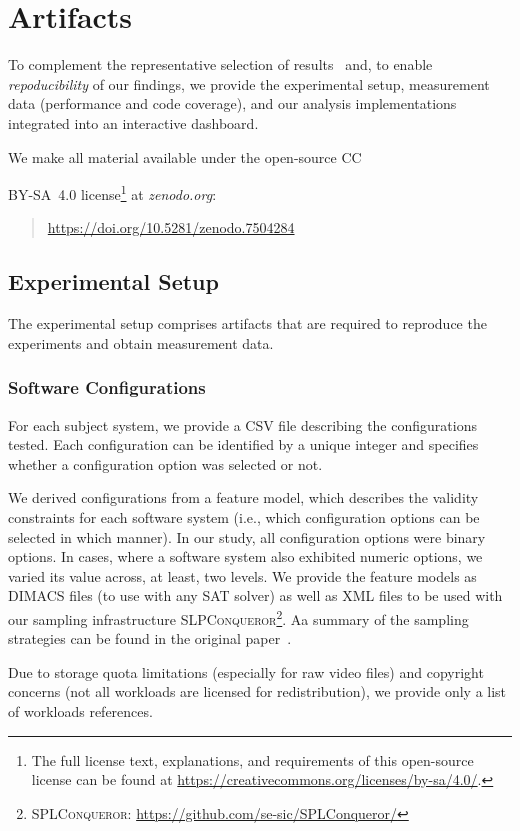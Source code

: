 \section{Artifacts}
To complement the representative selection of results~\cite{muhlbauer_workload_2023} and, to enable \textit{repoducibility} of our findings, we provide the experimental setup, measurement data (performance and code coverage), and our analysis implementations integrated into an interactive dashboard.

We make all material available under the open-source CC~{BY-SA~4.0 license\footnote{The full license text, explanations, and requirements of this open-source license can be found at \url{https://creativecommons.org/licenses/by-sa/4.0/}.} at \textit{zenodo.org}:
\begin{quotation}
	\url{https://doi.org/10.5281/zenodo.7504284}
\end{quotation}


\subsection{Experimental Setup}
The experimental setup comprises artifacts that are required to reproduce the experiments and obtain measurement data. 

\subsubsection{Software Configurations} For each subject system, we provide  a CSV file describing the configurations tested. Each configuration can be identified by a unique integer and specifies whether a configuration option was selected or not. 

We derived configurations from a feature model, which describes the validity constraints for each software system (i.e., which configuration options can be selected in which manner). In our study, all configuration options were binary options. In cases, where a software system also exhibited numeric options, we varied its value across, at least, two levels. We provide the feature models as DIMACS files (to use with any SAT solver) as well as XML files to be used with our sampling infrastructure \textsc{SLPConqueror}\footnote{\textsc{SPLConqueror}: \url{https://github.com/se-sic/SPLConqueror/}}. Aa summary of the sampling strategies can be found in the original paper~\cite{muhlbauer_workload_2023}.

Due to storage quota limitations (especially for raw video files) and copyright concerns (not all workloads are licensed for redistribution), we provide only a list of workloads references. 

}
